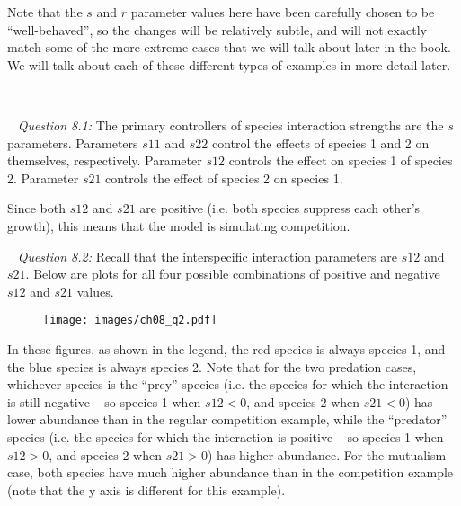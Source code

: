 \documentclass[12pt]{article}
\begin{document}
Note that the $s$ and $r$ parameter values here have been carefully chosen to be ``well-behaved'', so the changes will be relatively subtle, and will not exactly match some of the more extreme cases that we will talk about later in the book. We will talk about each of these different types of examples in more detail later.

~\newline

\pagebreak
{}

~\newline
\textit{Question 8.1:}
\newline
The primary controllers of species interaction strengths are the $s$ parameters. Parameters $s11$ and $s22$ control the effects of species 1 and 2 on themselves, respectively. Parameter $s12$ controls the effect on species 1 of species 2. Parameter $s21$ controls the effect of species 2 on species 1.

Since both $s12$ and $s21$ are positive (i.e. both species suppress each other's growth), this means that the model is simulating competition.

~\newline
\textit{Question 8.2:}
\newline
Recall that the interspecific interaction parameters are $s12$ and $s21$. Below are plots for all four possible combinations of positive and negative $s12$ and $s21$ values.

\begin{figure}[ht]
  \centering
  \texttt{[image: images/ch08\_q2.pdf]}
\end{figure}

In these figures, as shown in the legend, the red species is always species 1, and the blue species is always species 2. Note that for the two predation cases, whichever species is the ``prey'' species (i.e. the species for which the interaction is still negative -- so species 1 when $s12<0$, and species 2 when $s21<0$) has lower abundance than in the regular competition example, while the ``predator'' species (i.e. the species for which the interaction is positive -- so species 1 when $s12>0$, and species 2 when $s21>0$) has higher abundance. For the mutualism case, both species have much higher abundance than in the competition example (note that the y axis is different for this example).

~\newline
\end{document}
